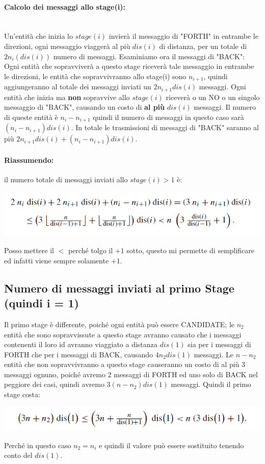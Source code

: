 \paragraph{Calcolo dei messaggi allo stage(i):}\ \\
Un'entità che inizia lo $stage(i)$ invierà il messaggio di "FORTH" in entrambe
le direzioni, ogni messaggio viaggerà al più $dis(i)$ di distanza, per un totale
di $2n_i(dis(i))$ numero di messaggi. Esaminiamo ora il messaggi di "BACK": Ogni
entità che sopravviverà a questo stage riceverà tale messaggio in entrambe le
direzioni, le entità che sopravvivranno allo stage(i) sono $n_{i+1}$, quindi
aggiungeranno al totale dei messaggi inviati un $2n_{i+1}dis(i)$ messaggi. Ogni
entità che inizia ma \textbf{non} sopravvive allo $stage(i)$ riceverà o un NO o
un singolo messaggio di "BACK", causando un costo di \textbf{al più} $dis(i)$
messaggi. Il numero di queste entità è $n_i - n_{i+1}$ quindi il numero di
messaggi in questo caso sarà  $(n_i - n_{i+1})dis(i)$. In totale le trasmissioni
di messaggi di "BACK" saranno al più $2n_{i+1}dis(i) + (n_i - n_{i+1})dis(i)$.

\paragraph{Riassumendo:} il numero totale di messaggi inviati allo $stage(i) > 1$
è:
\begin{center}
    \includegraphics[scale=0.6]{aa/bb.png}
\end{center}
Posso mettere il $<$ perché tolgo il $+1$ sotto, questo mi permette di
semplificare ed infatti viene sempre solamente $+1$.


\subsection{Numero di messaggi inviati al primo Stage (quindi i = 1)}
Il primo stage è differente, poiché ogni entità può essere CANDIDATE; le $n_2$
entità che sono sopravvissute a questo stage avranno causato che i messaggi
contenenti il loro id avranno viaggiato a distanza $dis(1)$ sia per i messaggi
di FORTH che per i messaggi di BACK, causando $4n_2dis(1)$ messaggi. Le $n-n_2$
entità che non sopravvivranno a  questo stage causeranno un costo di al più 3
messaggi ognuno, poiché avremo 2 messaggi di FORTH ed uno solo di BACK nel
peggiore dei casi, quindi avremo $3(n - n_2)dis(1)$ messaggi. Quindi il primo
stage costa:
\begin{center}
    \includegraphics[scale=0.6]{aa/cc.png}
\end{center}
Perché in questo caso $n_2 = n_i$ e quindi il valore può essere sostituito
tenendo conto del $dis(1)$.

